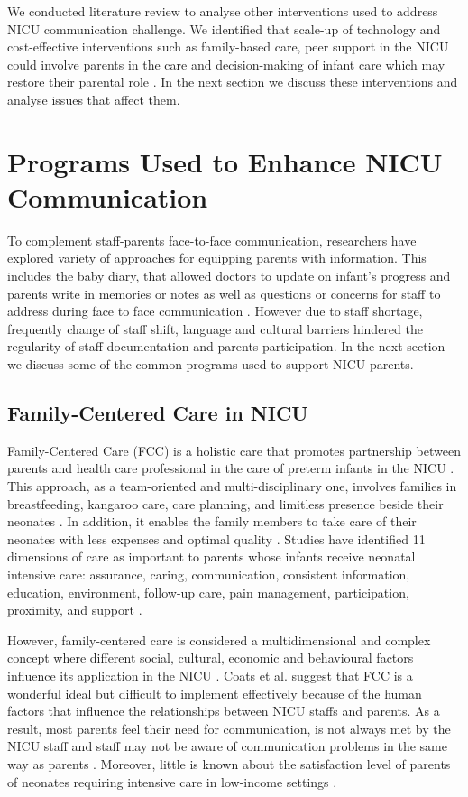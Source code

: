 We conducted literature review to analyse other interventions used to address NICU communication challenge. We identified that scale-up of technology and cost-effective interventions such as family-based care, peer support in the NICU could involve parents in the care and decision-making of infant care which may restore their parental role \citep{TePas2017, Ramezani2014, Mendelson2017}.  In the next section we discuss these interventions  and analyse issues that affect them. 

\section{Programs Used to Enhance NICU Communication}
To complement staff-parents face-to-face communication, researchers have explored variety of approaches for equipping parents with information. This includes the baby diary, that allowed doctors to update on infant's progress and parents write in memories or notes as well as questions or concerns for staff to address during face to face communication \citep{VandeVijver2015}. However due to staff shortage, frequently change of staff shift, language and cultural barriers hindered the regularity of staff documentation and parents participation. In the next section we discuss some of the common programs used to support NICU parents.

\subsection{Family-Centered Care in NICU}
Family-Centered Care (FCC) is a holistic care that promotes partnership between parents and health care professional in the care of preterm infants in the NICU \citep{Al-Motlaq2017,Shields2015,Ramezani2014}. This approach, as a team-oriented and multi-disciplinary one, involves families in breastfeeding, kangaroo care, care planning, and limitless presence beside their neonates \citep{Ramezani2014,Al-Motlaq2017}. In addition, it enables the family members to take care of their neonates with less expenses and optimal quality \citep{Ramezani2014}. Studies have identified 11 dimensions of care as important to parents whose infants receive neonatal intensive care: assurance, caring, communication, consistent information, education, environment, follow-up care, pain management, participation, proximity, and support \citep{Ranchod2004}.

However, family-centered care is considered a multidimensional and complex concept where different social, cultural, economic and behavioural factors influence its application in the NICU \citep{Ramezani2014}. Coats et al. \citep{Coats2018} suggest that FCC is a wonderful ideal but difficult to implement effectively because of the human factors that influence the relationships between NICU staffs and parents. As a result, most parents feel their need for communication, is not always met by the NICU staff and staff may not be aware of communication problems in the same way as parents \citep{Weis2014, Coats2018}. Moreover, little is known about the satisfaction level of parents of neonates requiring intensive care in low-income settings \citep{Russell2014, Oulton2011, D2016}.


